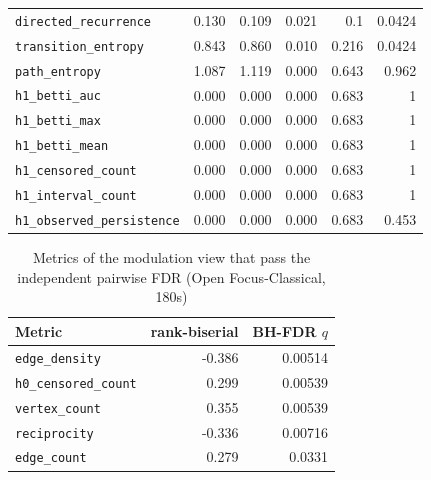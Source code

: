 \documentclass{article}
\begin{document}
\begin{table}[htbp]
\begin{tabular}{lrrrrr}
\rowcolor{orange!15}\verb|directed_recurrence|     &            0.130 &             0.109 &        0.021 &      0.1 &    0.0424 \\
\rowcolor{orange!15}\verb|transition_entropy|      &            0.843 &             0.860 &        0.010 &     0.216 &    0.0424 \\
\verb|path_entropy|            &            1.087 &             1.119 &        0.000 &     0.643 &     0.962 \\
\verb|h1_betti_auc|            &            0.000 &             0.000 &        0.000 &     0.683 &         1 \\
\verb|h1_betti_max|            &            0.000 &             0.000 &        0.000 &     0.683 &         1 \\
\verb|h1_betti_mean|           &            0.000 &             0.000 &        0.000 &     0.683 &         1 \\
\verb|h1_censored_count|       &            0.000 &             0.000 &        0.000 &     0.683 &         1 \\
\verb|h1_interval_count|       &            0.000 &             0.000 &        0.000 &     0.683 &         1 \\
\verb|h1_observed_persistence| &            0.000 &             0.000 &        0.000 &     0.683 &     0.453 \\
\bottomrule
\end{tabular}
\end{table}

\vspace{2em}

\begin{table}[h]
\centering
\caption{Metrics of the modulation view that pass the independent pairwise FDR (Open Focus-Classical, 180s)}
\label{tab:modulation_rank_biserial}
\renewcommand{\arraystretch}{1.5}
\begin{tabular}{lrr}
\toprule
Metric & rank-biserial & BH-FDR $q$ \\
\midrule
\verb|edge_density| & -0.386 & 0.00514 \\
\verb|h0_censored_count| & 0.299 & 0.00539 \\
\verb|vertex_count| & 0.355 & 0.00539 \\
\verb|reciprocity| & -0.336 & 0.00716 \\
\verb|edge_count| & 0.279 & 0.0331 \\
\bottomrule
\end{tabular}
\end{table}
\end{document}
